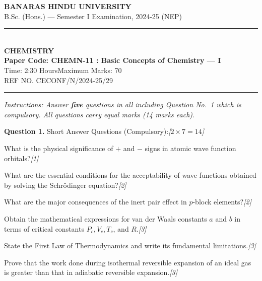 \documentclass[11pt,a4paper]{article}
\newcommand{\pts}[1]{\hfill   \textit{[#1]}}
\begin{document}
\begin{center}
  {\large\bfseries BANARAS HINDU UNIVERSITY}\\[2pt]
  {\normalsize B.Sc. (Hons.) --- Semester I Examination, 2024-25 (NEP)}\\[6pt]
  \rule{0.8\linewidth}{0.5pt}\\[6pt]
  {\large\bfseries CHEMISTRY}\\[4pt]
  {\large\bfseries Paper Code: CHEMN-11 : Basic Concepts of Chemistry --- I}\\[4pt]
  {\normalsize Time: 2:30 Hours\hfill Maximum Marks: 70}\\[2pt]
  {\small REF NO. CECONF/N/2024-25/29}
\end{center}

\rule{\linewidth}{0.4pt}

\smallskip



\noindent   \textit{Instructions: Answer   \textbf{five} questions in all including Question No.~1 which is compulsory. All questions carry equal marks (14 marks each).}

\bigskip




\noindent   \textbf{Question 1.} Short Answer Questions (Compulsory):\pts{$2  \times 7 = 14$}

\begin{parts}
  \item
  
\begin{parts}
    \item What is the physical significance of $+$ and $-$ signs in atomic wave function orbitals?\pts{1}
    \item What are the essential conditions for the acceptability of wave functions obtained by solving the Schrödinger equation?\pts{2}
  \end{parts}
  \item What are the major consequences of the inert pair effect in $p$-block elements?\pts{2}
  \item Obtain the mathematical expressions for van der Waals constants $a$ and $b$ in terms of critical constants $P_c, V_c, T_c$, and $R$.\pts{3}
  \item State the First Law of Thermodynamics and write its fundamental limitations.\pts{3}
  \item Prove that the work done during isothermal reversible expansion of an ideal gas is greater than that in adiabatic reversible expansion.\pts{3}
\end{parts}
\end{document}
